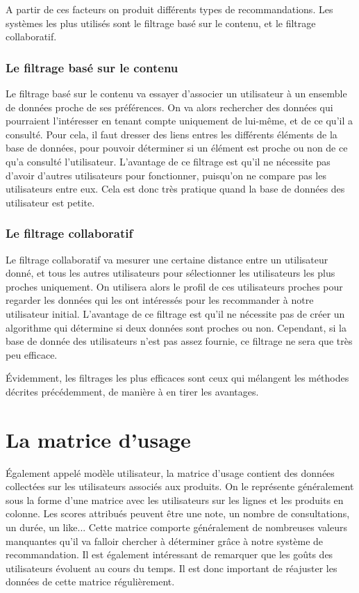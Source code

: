 \documentclass[11pt,a4paper]{report}
\begin{document}
A partir de ces facteurs on produit différents types de recommandations.
Les systèmes les plus utilisés sont le filtrage basé sur le contenu, et le filtrage collaboratif.

\subsubsection{Le filtrage basé sur le contenu}

Le filtrage basé sur le contenu va essayer d'associer un utilisateur à un ensemble de données proche de ses préférences. On va alors rechercher des données qui pourraient l'intéresser en tenant compte uniquement de lui-même, et de ce qu'il a consulté. Pour cela, il faut dresser des liens entres les différents éléments de la base de données, pour pouvoir déterminer si un élément est proche ou non de ce qu'a consulté l'utilisateur.
L'avantage de ce filtrage est qu'il ne nécessite pas d'avoir d'autres utilisateurs pour fonctionner, puisqu'on ne compare pas les utilisateurs entre eux. Cela est donc très pratique quand la base de données des utilisateur est petite.

\subsubsection{Le filtrage collaboratif}

Le filtrage collaboratif va mesurer une certaine distance entre un utilisateur donné, et tous les autres utilisateurs pour sélectionner les utilisateurs les plus proches uniquement.
On utilisera alors le profil de ces utilisateurs proches pour regarder les données qui les ont intéressés pour les recommander à notre utilisateur initial.
L'avantage de ce filtrage est qu'il ne nécessite pas de créer un algorithme qui détermine si deux données sont proches ou non. Cependant, si la base de donnée des utilisateurs n'est pas assez fournie, ce filtrage ne sera que très peu efficace.\par
Évidemment, les filtrages les plus efficaces sont ceux qui mélangent les méthodes décrites précédemment, de manière à en tirer les avantages.




\section{La matrice d'usage}

Également appelé modèle utilisateur, la matrice d'usage contient des données collectées sur les utilisateurs associés aux produits. On le représente généralement sous la forme d'une matrice avec les utilisateurs sur les lignes et les produits en colonne. Les scores attribués peuvent être une note, un nombre de consultations, un durée, un like... Cette matrice comporte généralement de nombreuses valeurs manquantes qu'il va falloir chercher à déterminer grâce à notre système de recommandation.  Il est également intéressant de remarquer que les goûts des utilisateurs évoluent au cours du temps. Il est donc important de réajuster les données de cette matrice régulièrement.
\end{document}
